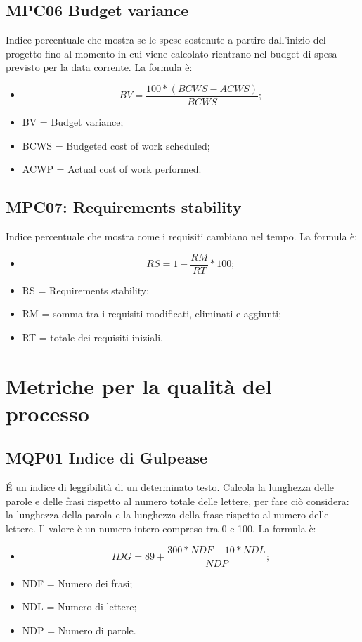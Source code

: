 \subsection{MPC06 Budget variance}
Indice percentuale che mostra se le spese sostenute a partire dall’inizio del progetto fino al momento in cui viene calcolato rientrano nel budget di spesa previsto per la data corrente.
La formula è:
\begin{itemize}
\item[] \[BV = \frac{100 * (BCWS - ACWS)}{BCWS};\]
\item BV = Budget variance;
\item BCWS = Budgeted cost of work scheduled;
\item ACWP = Actual cost of work performed.
\end{itemize}

\subsection{MPC07: Requirements stability}
Indice percentuale che mostra come i requisiti cambiano nel tempo.
La formula è:
\begin{itemize}
  \item[] \[RS = 1 - \frac{RM}{RT} * 100;\]
  \item RS = Requirements stability;
  \item RM = somma tra i requisiti modificati, eliminati e aggiunti;
  \item RT = totale dei requisiti iniziali.
  \end{itemize}

\pagebreak

\section{Metriche per la qualità del processo}
\subsection{MQP01 Indice di Gulpease}
\'E un indice di leggibilità di un determinato testo. Calcola la lunghezza delle parole e delle frasi rispetto al numero totale delle lettere, per fare ciò considera: la lunghezza della parola e la lunghezza della frase rispetto al numero delle lettere. Il valore è un numero intero compreso tra 0 e 100.
La formula è:
\begin{itemize}
  \item[] \[IDG =  89 + \frac{300 * NDF - 10 * NDL}{NDP};\]
  \item NDF = Numero dei frasi;
  \item NDL = Numero di lettere;
  \item NDP = Numero di parole.
  \end{itemize}


